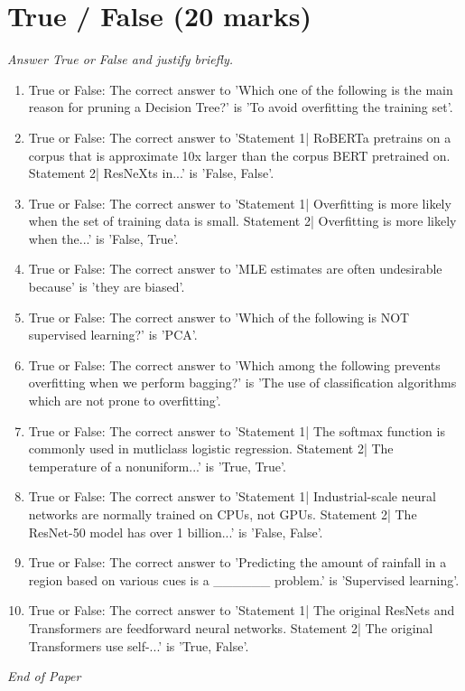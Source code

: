 \documentclass[12pt]{article}
\begin{document}
\section*{True / False (20 marks)}
\textit{Answer True or False and justify briefly.}
\begin{enumerate}[label=\arabic*.]
\item True or False: The correct answer to 'Which one of the following is the main reason for pruning a Decision Tree?' is 'To avoid overfitting the training set'.
\item True or False: The correct answer to 'Statement 1| RoBERTa pretrains on a corpus that is approximate 10x larger than the corpus BERT pretrained on. Statement 2| ResNeXts in...' is 'False, False'.
\item True or False: The correct answer to 'Statement 1| Overfitting is more likely when the set of training data is small. Statement 2| Overfitting is more likely when the...' is 'False, True'.
\item True or False: The correct answer to 'MLE estimates are often undesirable because' is 'they are biased'.
\item True or False: The correct answer to 'Which of the following is NOT supervised learning?' is 'PCA'.
\item True or False: The correct answer to 'Which among the following prevents overfitting when we perform bagging?' is 'The use of classification algorithms which are not prone to overfitting'.
\item True or False: The correct answer to 'Statement 1| The softmax function is commonly used in mutliclass logistic regression. Statement 2| The temperature of a nonuniform...' is 'True, True'.
\item True or False: The correct answer to 'Statement 1| Industrial-scale neural networks are normally trained on CPUs, not GPUs. Statement 2| The ResNet-50 model has over 1 billion...' is 'False, False'.
\item True or False: The correct answer to 'Predicting the amount of rainfall in a region based on various cues is a \_\_\_\_\_\_ problem.' is 'Supervised learning'.
\item True or False: The correct answer to 'Statement 1| The original ResNets and Transformers are feedforward neural networks. Statement 2| The original Transformers use self-...' is 'True, False'.
\end{enumerate}

\vfill
\noindent\textit{End of Paper}
\end{document}
